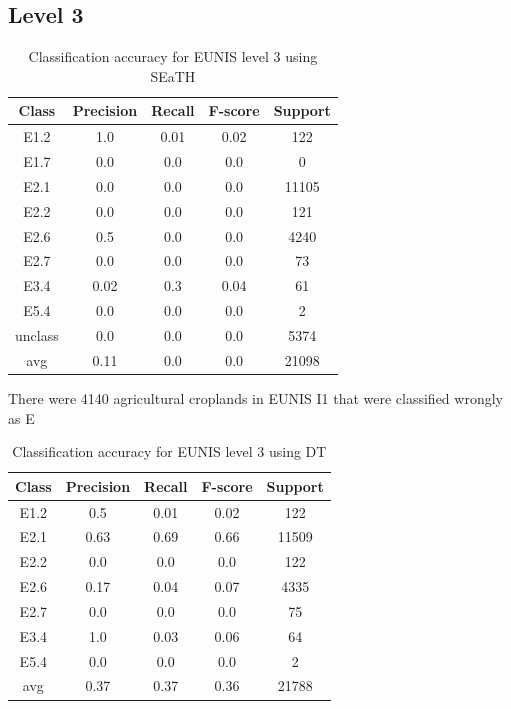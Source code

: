 \documentclass[authoryear, review,12pt,number]{elsarticle}
\begin{document}
\subsection{Level 3}
\begin{table}
\centering
\begin{tabular}{c c c c c}
Class & Precision & Recall & F-score & Support\\
\hline
E1.2 & 1.0 & 0.01 & 0.02 & 122\\
E1.7 & 0.0 & 0.0 & 0.0 & 0\\
E2.1 & 0.0 & 0.0 & 0.0 & 11105\\
E2.2 & 0.0 & 0.0 & 0.0 & 121\\
E2.6 & 0.5 & 0.0 & 0.0 & 4240\\
E2.7 & 0.0 & 0.0 & 0.0 & 73\\
E3.4 & 0.02 & 0.3 & 0.04 & 61\\
E5.4 & 0.0 & 0.0 & 0.0 & 2\\
unclass & 0.0 & 0.0 & 0.0 & 5374\\
avg & 0.11 & 0.0 & 0.0 & 21098\\
\end{tabular}
\caption{Classification accuracy for EUNIS level 3 using SEaTH}
\end{table}
There were 4140 agricultural croplands in EUNIS I1 that were classified wrongly 
as E 
\begin{table}
\centering
\begin{tabular}{c c c c c}
Class & Precision & Recall & F-score & Support\\
\hline
E1.2 & 0.5 & 0.01 & 0.02 & 122\\
E2.1 & 0.63 & 0.69 & 0.66 & 11509\\
E2.2 & 0.0 & 0.0 & 0.0 & 122\\
E2.6 & 0.17 & 0.04 & 0.07 & 4335\\
E2.7 & 0.0 & 0.0 & 0.0 & 75\\
E3.4 & 1.0 & 0.03 & 0.06 & 64\\
E5.4 & 0.0 & 0.0 & 0.0 & 2\\
avg & 0.37 & 0.37 & 0.36 & 21788\\
\end{tabular}
\caption{Classification accuracy for EUNIS level 3 using DT}
\end{table}
\end{document}
